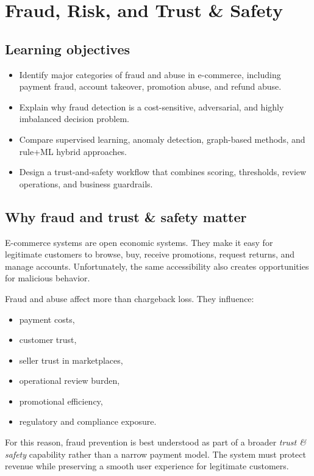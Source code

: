 \chapter{Fraud, Risk, and Trust \& Safety}

\section{Learning objectives}
\begin{itemize}
  \item Identify major categories of fraud and abuse in e-commerce, including payment fraud, account takeover, promotion abuse, and refund abuse.
  \item Explain why fraud detection is a cost-sensitive, adversarial, and highly imbalanced decision problem.
  \item Compare supervised learning, anomaly detection, graph-based methods, and rule+ML hybrid approaches.
  \item Design a trust-and-safety workflow that combines scoring, thresholds, review operations, and business guardrails.
\end{itemize}

\section{Why fraud and trust \& safety matter}
E-commerce systems are open economic systems.
They make it easy for legitimate customers to browse, buy, receive promotions, request returns, and manage accounts.
Unfortunately, the same accessibility also creates opportunities for malicious behavior.

Fraud and abuse affect more than chargeback loss.
They influence:
\begin{itemize}
  \item payment costs,
  \item customer trust,
  \item seller trust in marketplaces,
  \item operational review burden,
  \item promotional efficiency,
  \item regulatory and compliance exposure.
\end{itemize}

For this reason, fraud prevention is best understood as part of a broader \emph{trust \& safety} capability rather than a narrow payment model.
The system must protect revenue while preserving a smooth user experience for legitimate customers.

